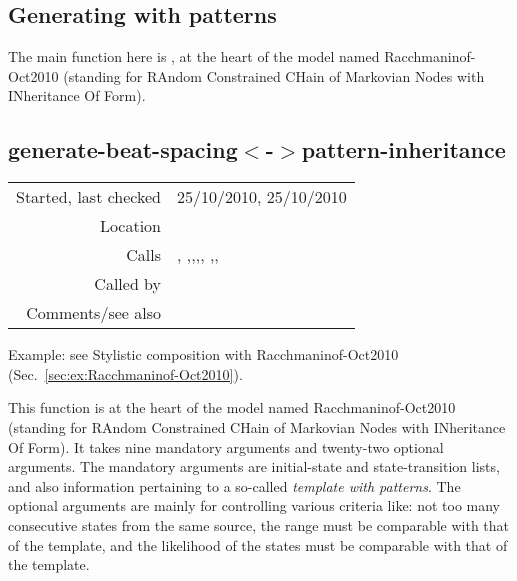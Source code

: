 \subsection{Generating with patterns}\label{sec:generating-with-patterns}

The main function here is
, at the heart of the model named Racchmaninof-Oct2010
(standing for RAndom Constrained CHain of Markovian
Nodes with INheritance Of Form).


\subsection*{generate-beat-spacing$<$-$>$pattern-inheritance}\label{fun:generate-beat-spacing<->pattern-inheritance}

\vspace{0.3cm}
\begin{tabular}{r|p{8cm}}
Started, last checked & 25/10/2010, 25/10/2010 \\
Location & \nameref{sec:generating-with-patterns} \\
Calls & \nameref{fun:generate-beat-spacing-for-intervals}, \nameref{fun:generate-intervals},\newline \nameref{fun:indices-of-max-subset-score},\newline \nameref{fun:merge-sort-by-vector<vector-car},\newline \nameref{fun:my-last}, \nameref{fun:nth-list-of-lists},\newline \nameref{fun:translate-to-other-occurrences}, \nameref{fun:translation} \\
Called by & \\
Comments/see also &
\end{tabular}

\vspace{0.5cm}
\noindent Example: see Stylistic composition with
Racchmaninof-Oct2010
(Sec.~\ref{sec:ex:Racchmaninof-Oct2010}).
\vspace{0.5cm}

\noindent This function is at the heart of the model
named Racchmaninof-Oct2010 (standing for RAndom
Constrained CHain of Markovian Nodes with INheritance
Of Form). It takes nine mandatory arguments and
twenty-two optional arguments. The mandatory arguments
are initial-state and state-transition lists, and also
information pertaining to a so-called \emph{template
with patterns}. The optional arguments are mainly for
controlling various criteria like: not too many
consecutive states from the same source, the range
must be comparable with that of the template, and the
likelihood of the states must be comparable with that
of the template.


